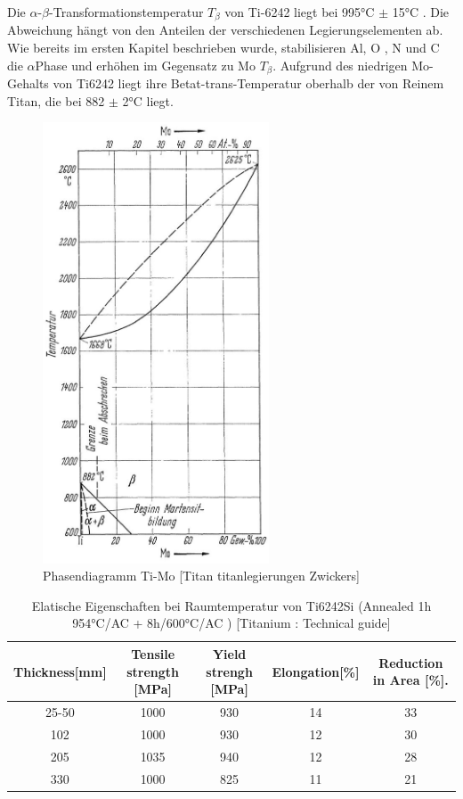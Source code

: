Die $\alpha$-$\beta$-Transformationstemperatur $T_{\beta}$ von Ti-6242 liegt bei 995°C $\pm$ 15°C . Die Abweichung hängt  von den Anteilen der verschiedenen Legierungselementen ab. Wie bereits im ersten Kapitel beschrieben wurde, stabilisieren  Al, O , N und C die $\alpha$Phase und erhöhen im Gegensatz zu Mo  {$T_{\beta}$}.
Aufgrund des niedrigen Mo-Gehalts von Ti6242 liegt ihre Betat-trans-Temperatur oberhalb der von Reinem Titan, die bei 882 $\pm$ 2°C liegt.


\begin{figure}[H]
	\centering
	\includegraphics[width= 0.6\textwidth]{Bilder/TiMo}
	\caption{Phasendiagramm Ti-Mo [Titan titanlegierungen Zwickers]}
	\label{TiMo}
\end{figure}

\begin{table}[H]
	\small
	\tabcolsep=0.09cm
	\centering	
	\begin{tabular}{|c |c |c|c |c|}
		\hline
		\centering
		Thickness[mm] & Tensile strength [MPa] & Yield strengh [MPa] & Elongation[\%]& Reduction in Area [\%]. \\
		\hline
		25-50&1000&930&14&33\\
		102&1000&930&12&30\\
		205&1035&940&12&28\\
		330&1000&825&11&21\\
		
		\hline
	\end{tabular}
	\caption{Elatische Eigenschaften bei Raumtemperatur von Ti6242Si (Annealed 1h 954°C/AC + 8h/600°C/AC )  [Titanium : Technical guide]}
	\label{Mecprop}
\end{table}






